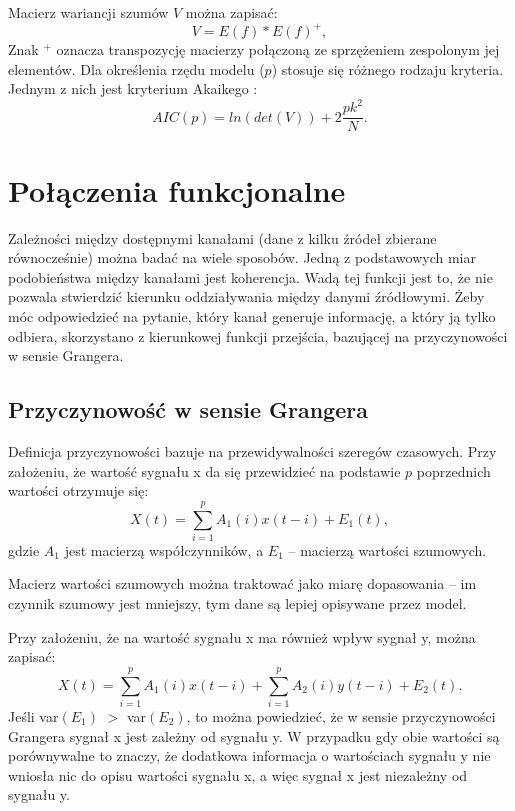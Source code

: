 \documentclass{pracamgr_2}
\begin{document}
	Macierz wariancji szumów $V$ można zapisać:
	\begin{equation}
		V = E(f)*E(f)^{+},
	\end{equation}
	Znak $^{+}$ oznacza transpozycję macierzy połączoną ze sprzężeniem zespolonym jej elementów.
	Dla określenia rzędu modelu ($p$) stosuje się różnego rodzaju kryteria. Jednym z nich jest kryterium Akaikego \citep[s. 79]{jarek}:
	\begin{equation}
		AIC(p) = ln(det(V))+2\frac{pk^2}{N}.
	\end{equation}
	\section{Połączenia funkcjonalne}
	Zależności między dostępnymi kanałami (dane z kilku źródeł zbierane równocześnie) można badać na wiele sposobów. Jedną z podstawowych miar podobieństwa między kanałami jest koherencja. Wadą tej funkcji jest to, że nie pozwala stwierdzić kierunku oddziaływania między danymi źródłowymi. Żeby móc odpowiedzieć na pytanie, który kanał generuje informację, a który ją tylko odbiera, skorzystano z kierunkowej funkcji przejścia, bazującej na przyczynowości w sensie Grangera.
	
	\subsection{Przyczynowość w sensie Grangera}
	Definicja przyczynowości bazuje na przewidywalności szeregów czasowych. Przy założeniu, że wartość sygnału x da się przewidzieć na podstawie $p$ poprzednich wartości otrzymuje się:
	\begin{equation}
		X(t) = \sum_{i=1}^{p}A_1(i)x(t-i)+E_1(t),
	\end{equation}
	gdzie $A_1$ jest macierzą współczynników, a $E_1$ -- macierzą wartości szumowych.
	
	Macierz wartości szumowych można traktować jako miarę dopasowania -- im czynnik szumowy jest mniejszy, tym dane są lepiej opisywane przez model.
	
	Przy założeniu, że na wartość sygnału x ma również wpływ sygnał y, można zapisać:
	\begin{equation}
		X(t) = \sum_{i=1}^{p}A_1(i)x(t-i)+\sum_{i=1}^{p}A_2(i)y(t-i)+E_2(t).
	\end{equation}
	Jeśli var$(E_1)$ $>$ var$(E_2)$, to można powiedzieć, że w sensie przyczynowości Grangera sygnał x jest zależny od sygnału y. W przypadku gdy obie wartości są porównywalne to znaczy, że dodatkowa informacja o wartościach sygnału y nie wniosła nic do opisu wartości sygnału x, a więc sygnał x jest niezależny od sygnału y.
\end{document}
